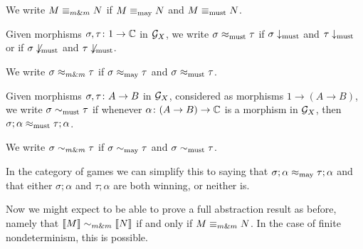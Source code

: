 \documentclass[11pt]{report}
\begin{document}
We write $M\mathrel{\equiv_{m\&m}} N$ if $M\equiv_{\operatorname{may}} N$ and $M\equiv_{\operatorname{must}} N$.

\begin{definition}
  Given morphisms $\sigma,\tau \colon 1 \to \mathbb{C}$ in $\mathcal G_X$, we write $\sigma\approx_{\operatorname{must}}\tau$ if $\sigma\downarrow_{\operatorname{must}}$ and $\tau\downarrow_{\operatorname{must}}$ or if $\sigma\not\downarrow_{\operatorname{must}}$ and $\tau\not\downarrow_{\operatorname{must}}$.  
\end{definition}

We write $\sigma\mathrel{\approx_{m\&m}} \tau$ if $\sigma\approx_{\operatorname{may}}\tau$ and $\sigma\approx_{\operatorname{must}}\tau$.

\begin{definition}
  Given morphisms $\sigma,\tau\colon A \to B$ in $\mathcal G_X$, considered as morphisms $1 \to (A \to B)$, we write $\sigma\sim_{\operatorname{must}}\tau$ if whenever $\alpha\colon (A \to B) \to \mathbb{C}$ is a morphism in $\mathcal G_X$, then $\sigma;\alpha\approx_{\operatorname{must}}\tau;\alpha$.
\end{definition}

We write $\sigma\mathrel{\sim_{m\&m}} \tau$ if $\sigma\sim_{\operatorname{may}}\tau$ and $\sigma\sim_{\operatorname{must}} \tau$.

\begin{remark}
  In the category of games we can simplify this to saying that $\sigma;\alpha\approx_{\operatorname{may}}\tau;\alpha$ and that either $\sigma;\alpha$ and $\tau;\alpha$ are both winning, or neither is.
\end{remark}

Now we might expect to be able to prove a full abstraction result as before, namely that $\left\llbracket M\right\rrbracket\mathrel{\sim_{m\&m}} \left\llbracket N\right\rrbracket$ if and only if $M\mathrel{\equiv_{m\&m}} N$.  
In the case of finite nondeterminism, this is possible.
\end{document}
